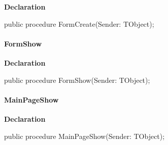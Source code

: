 \documentclass{report}
\newif\ifpdf
\begin{document}
\label{settings.TForm2-FormCreate}
\begin{list}{}{
\setlength{\itemindent}{0cm}
\setlength{\listparindent}{0cm}
\setlength{\leftmargin}{\evensidemargin}
\addtolength{\leftmargin}{\tmplength}
\settowidth{\labelsep}{X}
\addtolength{\leftmargin}{\labelsep}
\setlength{\labelwidth}{\tmplength}
}
\item[\textbf{Declaration}\hfill]
\ifpdf
\begin{flushleft}
\fi
\begin{ttfamily}
public procedure FormCreate(Sender: TObject);\end{ttfamily}

\ifpdf
\end{flushleft}
\fi

\end{list}
\paragraph*{FormShow}\hspace*{\fill}

\label{settings.TForm2-FormShow}
\begin{list}{}{
\setlength{\itemindent}{0cm}
\setlength{\listparindent}{0cm}
\setlength{\leftmargin}{\evensidemargin}
\addtolength{\leftmargin}{\tmplength}
\settowidth{\labelsep}{X}
\addtolength{\leftmargin}{\labelsep}
\setlength{\labelwidth}{\tmplength}
}
\item[\textbf{Declaration}\hfill]
\ifpdf
\begin{flushleft}
\fi
\begin{ttfamily}
public procedure FormShow(Sender: TObject);\end{ttfamily}

\ifpdf
\end{flushleft}
\fi

\end{list}
\paragraph*{MainPageShow}\hspace*{\fill}

\label{settings.TForm2-MainPageShow}
\begin{list}{}{
\setlength{\itemindent}{0cm}
\setlength{\listparindent}{0cm}
\setlength{\leftmargin}{\evensidemargin}
\addtolength{\leftmargin}{\tmplength}
\settowidth{\labelsep}{X}
\addtolength{\leftmargin}{\labelsep}
\setlength{\labelwidth}{\tmplength}
}
\item[\textbf{Declaration}\hfill]
\ifpdf
\begin{flushleft}
\fi
\begin{ttfamily}
public procedure MainPageShow(Sender: TObject);\end{ttfamily}

\ifpdf
\end{flushleft}
\fi

\end{list}
\end{document}
